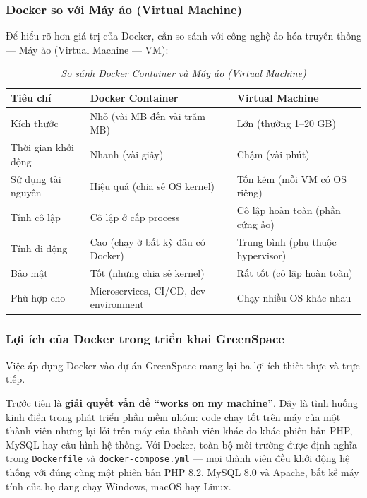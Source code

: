 \documentclass[11pt, a4paper]{article}
\begin{document}
\subsubsection{Docker so với Máy ảo (Virtual Machine)}

Để hiểu rõ hơn giá trị của Docker, cần so sánh với công nghệ ảo hóa truyền thống --- Máy ảo (Virtual Machine --- VM):

\begin{table}[H]
    \centering
    \small
    \renewcommand{\arraystretch}{1.6}
    \caption{\textit{So sánh Docker Container và Máy ảo (Virtual Machine)}}
    \vspace{0.3cm}
    \begin{tabularx}{\linewidth}{|>{\raggedright\arraybackslash}p{3.2cm}|Y|Y|}
        \hline
        \textbf{Tiêu chí} & \textbf{Docker Container} & \textbf{Virtual Machine} \\ \hline
        Kích thước & Nhỏ (vài MB đến vài trăm MB) & Lớn (thường 1--20 GB) \\ \hline
        Thời gian khởi động & Nhanh (vài giây) & Chậm (vài phút) \\ \hline
        Sử dụng tài nguyên & Hiệu quả (chia sẻ OS kernel) & Tốn kém (mỗi VM có OS riêng) \\ \hline
        Tính cô lập & Cô lập ở cấp process & Cô lập hoàn toàn (phần cứng ảo) \\ \hline
        Tính di động & Cao (chạy ở bất kỳ đâu có Docker) & Trung bình (phụ thuộc hypervisor) \\ \hline
        Bảo mật & Tốt (nhưng chia sẻ kernel) & Rất tốt (cô lập hoàn toàn) \\ \hline
        Phù hợp cho & Microservices, CI/CD, dev environment & Chạy nhiều OS khác nhau \\ \hline
    \end{tabularx}
\end{table}

\subsubsection{Lợi ích của Docker trong triển khai GreenSpace}

Việc áp dụng Docker vào dự án GreenSpace mang lại ba lợi ích thiết thực và trực tiếp.

Trước tiên là \textbf{giải quyết vấn đề ``works on my machine''}. Đây là tình huống kinh điển trong phát triển phần mềm nhóm: code chạy tốt trên máy của một thành viên nhưng lại lỗi trên máy của thành viên khác do khác phiên bản PHP, MySQL hay cấu hình hệ thống. Với Docker, toàn bộ môi trường được định nghĩa trong \texttt{Dockerfile} và \texttt{docker-compose.yml} --- mọi thành viên đều khởi động hệ thống với đúng cùng một phiên bản PHP 8.2, MySQL 8.0 và Apache, bất kể máy tính của họ đang chạy Windows, macOS hay Linux.
\end{document}
